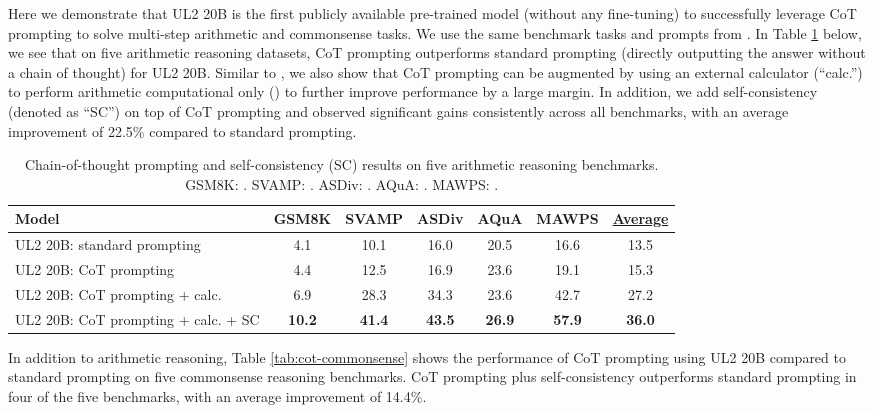 \documentclass[10pt]{article}
\begin{document}
Here we demonstrate that UL2 20B is the first publicly available pre-trained model (without any fine-tuning) to successfully leverage CoT prompting to solve multi-step arithmetic and commonsense tasks.
We use the same benchmark tasks and prompts from \citet{wei2022chain}.
In Table \ref{tab:cot-arithmetic} below, we see that on five arithmetic reasoning datasets, CoT prompting outperforms standard prompting (directly outputting the answer without a chain of thought) for UL2 20B.
Similar to \citet{wei2022chain}, we also show that CoT prompting can be augmented by using an external calculator (``calc.'') to perform arithmetic computational only () to further improve performance by a large margin. In addition, we add self-consistency \citep{self_consistency} (denoted as ``SC'') on top of CoT prompting and observed significant gains consistently across all benchmarks, with an average improvement of 22.5\% compared to standard prompting.

\begin{table}[H]
    \centering
    \small
      \caption{Chain-of-thought prompting and self-consistency (SC) results on five arithmetic reasoning benchmarks.
      GSM8K: \citep{cobbe2021training}.
      SVAMP: \citep{patel-etal-2021-nlp}.
      ASDiv: \citep{miao-etal-2020-diverse}.
      AQuA: \citep{ling-etal-2017-program}.
      MAWPS: \citep{koncel-kedziorski-etal-2016-mawps}.
      }
    \label{tab:cot-arithmetic}
    \begin{tabular}{l ccccc c}
    \toprule 
    Model     & GSM8K & SVAMP & ASDiv & AQuA & MAWPS & \underline{Average} \\
    \midrule 
   UL2 20B: standard prompting & 4.1 & 10.1 & 16.0 & 20.5 & 16.6 & 13.5 \\
    UL2 20B: CoT prompting & 4.4 & 12.5 & 16.9 & 23.6 & 19.1 & 15.3 \\
    UL2 20B: CoT prompting + calc. & 6.9 & 28.3 & 34.3 & 23.6 & 42.7 & 27.2 \\
    UL2 20B: CoT prompting + calc. + SC & \textbf{10.2} & \textbf{41.4} & \textbf{43.5} & \textbf{26.9} & \textbf{57.9} & \textbf{36.0}\\
    \bottomrule
    \end{tabular}
\end{table}

In addition to arithmetic reasoning, Table \ref{tab:cot-commonsense} shows the performance of CoT prompting using UL2 20B compared to standard prompting on five commonsense reasoning benchmarks.
CoT prompting plus self-consistency outperforms standard prompting in four of the five benchmarks, with an average improvement of 14.4\%. 
\end{document}
